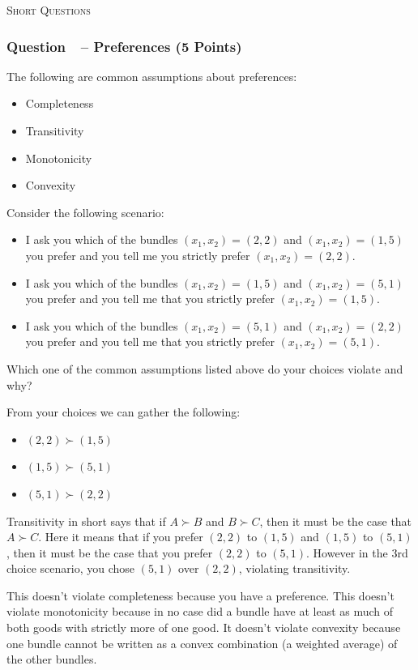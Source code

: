 \documentclass[10pt]{article}
\newcommand{\topic}[1]{\medskip\begin{center}\large\textsc{#1}\normalsize
  \end{center}}
\newcounter{question}[section]
\newcommand{\question}[1]{\refstepcounter{question}
  \subsubsection*{Question~\thequestion~-- #1}}
\begin{document}
\topic{Short Questions}
\question{Preferences (5 Points)}
The following are common assumptions about preferences:
\begin{itemize}
  \item Completeness
  \item Transitivity
  \item Monotonicity
  \item Convexity
\end{itemize}
Consider the following scenario:
\begin{itemize}
  \item I ask you which of the bundles $\left( x_1,x_2 \right)=\left( 2,2
    \right)$ and $\left(x_1,x_2  \right)=\left( 1, 5 \right)$ you prefer and you
    tell me you strictly prefer $\left( x_1,x_2 \right)=\left( 2,2 \right)$.
  \item I ask you which of the bundles $\left( x_1,x_2 \right)=\left( 1,5
    \right)$ and $\left( x_1,x_2 \right)=\left( 5,1 \right)$ you prefer and you
    tell me that you strictly prefer $\left( x_1,x_2 \right)=\left( 1,5
    \right)$.
  \item I ask you which of the bundles $\left( x_1,x_2 \right)=\left( 5,1
    \right)$ and $\left( x_1,x_2 \right)=\left( 2,2 \right)$ you prefer and you
    tell me that you strictly prefer $\left( x_1,x_2 \right)=\left( 5,1
    \right)$.
\end{itemize}
Which one of the common assumptions listed above do your choices violate and why?
\textcolor{solution-color}{
  From your choices we can gather the following:
  \begin{itemize}
    \item $\left( 2,2 \right)\succ \left( 1,5 \right)$
    \item $\left(1,5 \right)\succ\left( 5,1 \right)$
    \item $\left( 5,1 \right)\succ \left( 2,2 \right)$
  \end{itemize}
  Transitivity in short says that if $A\succ B$ and $B\succ C$, then it must be
  the case that $A\succ C$. Here it means that
  if you prefer $\left( 2,2 \right)$ to $\left( 1,5
  \right)$ and $\left( 1,5 \right)$ to $\left( 5,1 \right)$, then it must be
  the case that you prefer $\left( 2,2 \right)$ to $\left( 5,1 \right)$.
  However in the 3rd choice scenario, you chose $\left( 5,1 \right)$ over
  $\left( 2,2 \right)$, violating transitivity.
}

\textcolor{solution-color}{
  This doesn't violate completeness because you have a preference. This doesn't violate monotonicity because in no case did a bundle have at least as much of both goods with strictly more of one good. It doesn't violate convexity because one bundle cannot be written as a convex combination (a weighted average) of the other bundles.
}
\end{document}

